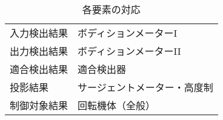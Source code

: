 \begin{table}[h]
    \centering
    \caption{各要素の対応}\label{tab:electric-servo-mechanism-parts}
    \begin{tabular}{|l|l|}
        \hline
        入力検出結果 & ボディションメーターI    \\
        出力検出結果 & ボディションメーターII   \\
        適合検出結果 & 適合検出器          \\
        投影結果   & サージェントメーター・高度制 \\
        制御対象結果 & 回転機体（全般）       \\
        \hline
    \end{tabular}
\end{table}
